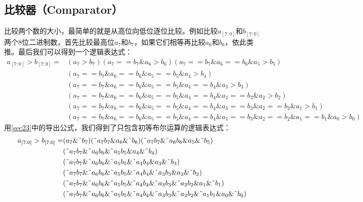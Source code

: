 \subsection{比较器（Comparator）}
比较两个数的大小，最简单的就是从高位向低位逐位比较。例如比较$a_{[7:0]}$和$b_{[7:0]}$两个8位二进制数，首先比较最高位$a_7$和$b_7$，如果它们相等再比较$a_6$和$b_6$，依此类推。最后我们可以得到一个逻辑表达式：
\[\begin{split}
a_{[7:0]}\mathtt{>}b_{[7:0]}=&(a_7\mathtt{>}b_7)(a_7\mathtt{==}b_7\& a_6\mathtt{>}b_6)(a_7\mathtt{==}b_7\& a_6\mathtt{==}b_6\& a_5\mathtt{>}b_5)\\
&(a_7\mathtt{==}b_7\& a_6\mathtt{==}b_6\& a_5\mathtt{==}b_5\& a_4\mathtt{>}b_4)\\
&(a_7\mathtt{==}b_7\& a_6\mathtt{==}b_6\& a_5\mathtt{==}b_5\& a_4\mathtt{==}b_4\& a_3\mathtt{>}b_3)\\
&(a_7\mathtt{==}b_7\& a_6\mathtt{==}b_6\& a_5\mathtt{==}b_5\& a_4\mathtt{==}b_4\& a_3\mathtt{==}b_3\& a_2\mathtt{>}b_2)\\
&(a_7\mathtt{==}b_7\& a_6\mathtt{==}b_6\& a_5\mathtt{==}b_5\& a_4\mathtt{==}b_4\& a_3\mathtt{==}b_3\& a_2\mathtt{==}b_2\& a_1\mathtt{>}b_1)\\
&(a_7\mathtt{==}b_7\& a_6\mathtt{==}b_6\& a_5\mathtt{==}b_5\& a_4\mathtt{==}b_4\& a_3\mathtt{==}b_3\& a_2\mathtt{==}b_2\& a_1\mathtt{==}b_1\& a_0\mathtt{>}b_0)
\end{split}\]
用\autoref{sec23}中的导出公式，我们得到了只包含初等布尔运算的逻辑表达式：
\[\begin{split}
a_{[7:0]}>b_{[7:0]}=&(a_7\&\textrm{\~{}}b_7)(\textrm{\~{}}a_7b_7\& a_6\&\textrm{\~{}}b_6)(\textrm{\~{}}a_7b_7\&\textrm{\~{}}a_6b_6\& a_5\&\textrm{\~{}}b_5)\\
					&(\textrm{\~{}}a_7b_7\&\textrm{\~{}}a_6b_6\&\textrm{\~{}}a_5b_5\& a_4\&\textrm{\~{}}b_4)\\
					&(\textrm{\~{}}a_7b_7\&\textrm{\~{}}a_6b_6\&\textrm{\~{}}a_5b_5\&\textrm{\~{}}a_4b_4\& a_3\&\textrm{\~{}}b_3)\\
					&(\textrm{\~{}}a_7b_7\&\textrm{\~{}}a_6b_6\&\textrm{\~{}}a_5b_5\&\textrm{\~{}}a_4b_4\&\textrm{\~{}}a_3b_3\& a_2\&\textrm{\~{}}b_2)\\
					&(\textrm{\~{}}a_7b_7\&\textrm{\~{}}a_6b_6\&\textrm{\~{}}a_5b_5\&\textrm{\~{}}a_4b_4\&\textrm{\~{}}a_3b_3\&\textrm{\~{}}a_2b_2\& a_1\&\textrm{\~{}}b_1)\\
					&(\textrm{\~{}}a_7b_7\&\textrm{\~{}}a_6b_6\&\textrm{\~{}}a_5b_5\&\textrm{\~{}}a_4b_4\&\textrm{\~{}}a_3b_3\&\textrm{\~{}}a_2b_2\&\textrm{\~{}}a_1b_1\& a_0\&\textrm{\~{}}b_0)
\end{split}\]

